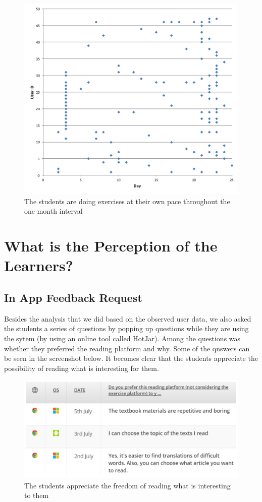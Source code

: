   \begin{figure}[h!]
  \centering
    \includegraphics[width=\columnwidth]{figures/user_exercise_activity_vs_day.pdf}
    \caption{The students are doing exercises at their own pace throughout the one month interval }
    \label{fig:activity_per_day}
  \end{figure}

\newpage
\section{What is the Perception of the Learners?}

\subsection{In App Feedback Request}
Besides the analysis that we did based on the observed user data, we also asked the students a series of questions by popping up questions while they are using the sytem (by using an online tool called HotJar). Among the questions was whether they preferred the reading platform and why. Some of the qnswers can be seen in the screenshot below. It becomes clear that the students appreciate the possibility of reading what is interesting for them.

    \begin{figure}[h!]
    \centering
      \includegraphics[width=0.9\columnwidth]{figures/opinion_on_reading_platform}
      \caption{The students appreciate the freedom of reading what is interesting to them }
    \end{figure}

